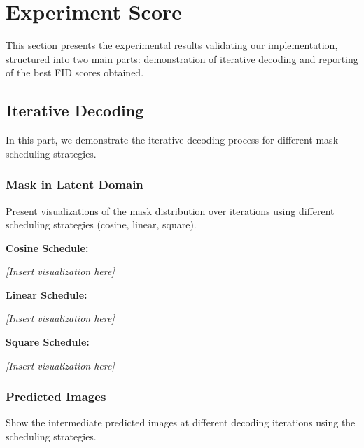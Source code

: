 \section{Experiment Score}
\label{sec:experiment}

This section presents the experimental results validating our implementation, structured into two main parts: demonstration of iterative decoding and reporting of the best FID scores obtained.

\subsection{Iterative Decoding}
In this part, we demonstrate the iterative decoding process for different mask scheduling strategies.

\subsubsection{Mask in Latent Domain}
Present visualizations of the mask distribution over iterations using different scheduling strategies (cosine, linear, square).


\textbf{Cosine Schedule:}

\textit{[Insert visualization here]}

\textbf{Linear Schedule:}

\textit{[Insert visualization here]}

\textbf{Square Schedule:}

\textit{[Insert visualization here]}

\subsubsection{Predicted Images}
Show the intermediate predicted images at different decoding iterations using the scheduling strategies.

